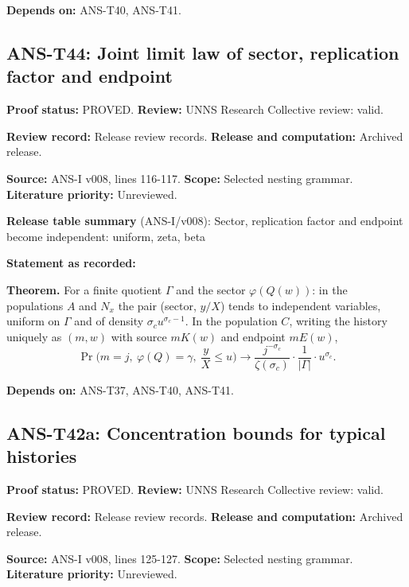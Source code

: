\documentclass[
  11pt,
]{article}
\begin{document}
\textbf{Depends on:} ANS-T40, ANS-T41.

\hypertarget{ans-t44-joint-limit-law-of-sector-replication-factor-and-endpoint}{%
\subsection{ANS-T44: Joint limit law of sector, replication factor and
endpoint}\label{ans-t44-joint-limit-law-of-sector-replication-factor-and-endpoint}}

\textbf{Proof status:} PROVED. \textbf{Review:} UNNS Research Collective
review: valid.

\textbf{Review record:} Release review records. \textbf{Release and
computation:} Archived release.

\textbf{Source:} ANS-I v008, lines 116-117. \textbf{Scope:} Selected
nesting grammar. \textbf{Literature priority:} Unreviewed.

\textbf{Release table summary} (ANS-I/v008): Sector, replication factor
and endpoint become independent: uniform, zeta, beta

\textbf{Statement as recorded:}

\textbf{Theorem.} For a finite quotient \(\Gamma\) and the sector
\(\varphi(Q(w))\): in the populations \(A\) and \(N_x\) the pair
(sector, \(y/X\)) tends to independent variables, uniform on \(\Gamma\)
and of density \(\sigma_cu^{\sigma_c-1}\). In the population \(C\),
writing the history uniquely as \((m,w)\) with source \(mK(w)\) and
endpoint \(mE(w)\),
\[\Pr\Big(m=j,\ \varphi(Q)=\gamma,\ \frac yX\le u\Big)\to\frac{j^{-\sigma_c}}{\zeta(\sigma_c)}\cdot\frac1{|\Gamma|}\cdot u^{\sigma_c}.\]

\textbf{Depends on:} ANS-T37, ANS-T40, ANS-T41.

\hypertarget{ans-t42a-concentration-bounds-for-typical-histories}{%
\subsection{ANS-T42a: Concentration bounds for typical
histories}\label{ans-t42a-concentration-bounds-for-typical-histories}}

\textbf{Proof status:} PROVED. \textbf{Review:} UNNS Research Collective
review: valid.

\textbf{Review record:} Release review records. \textbf{Release and
computation:} Archived release.

\textbf{Source:} ANS-I v008, lines 125-127. \textbf{Scope:} Selected
nesting grammar. \textbf{Literature priority:} Unreviewed.
\end{document}
